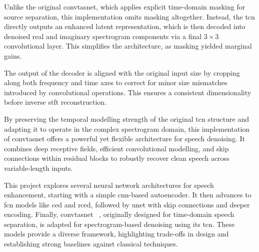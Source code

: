 Unlike the original \gls{convtasnet}, which applies explicit time-domain masking for source separation, this implementation omits masking altogether. Instead, the \gls{tcn} directly outputs an enhanced latent representation, which is then decoded into denoised real and imaginary spectrogram components via a final \(3 \times 3\) convolutional layer. This simplifies the architecture, as masking yielded marginal gains.

The output of the decoder is aligned with the original input size by cropping along both frequency and time axes to correct for minor size mismatches introduced by convolutional operations. This ensures a consistent dimensionality before inverse \gls{stft} reconstruction.

By preserving the temporal modelling strength of the original \gls{tcn} structure and adapting it to operate in the complex spectrogram domain, this implementation of \gls{convtasnet} offers a powerful yet flexible architecture for speech denoising. It combines deep receptive fields, efficient convolutional modelling, and skip connections within residual blocks to robustly recover clean speech across variable-length inputs.

\vspace{2em}

This project explores several neural network architectures for speech enhancement, starting with a simple \gls{cnn}-based autoencoder. It then advances to \gls{fcn} models like \gls{ced} and \gls{rced}\~\cite{park2017acoustic}, followed by \gls{unet} with skip connections and deeper encoding. Finally, \gls{convtasnet} ~\cite{Luo2018ConvTasNetSI}, originally designed for time-domain speech separation, is adapted for spectrogram-based denoising using its \gls{tcn}. These models provide a diverse framework, highlighting trade-offs in design and establishing strong baselines against classical techniques.

